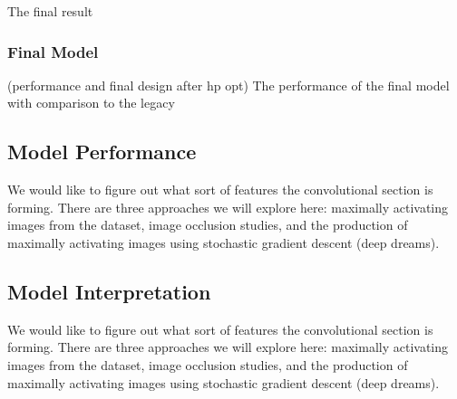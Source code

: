 The final result


\subsubsection{Final Model}
(performance and final design after hp opt)
The performance of the final model with comparison to the legacy

\subsection{Model Performance}
We would like to figure out what sort of features the convolutional section is forming. There are three approaches we will explore here: maximally activating images from the dataset, image occlusion studies, and the production of maximally activating images using stochastic gradient descent (deep dreams).  

\subsection{Model Interpretation}
We would like to figure out what sort of features the convolutional section is forming. There are three approaches we will explore here: maximally activating images from the dataset, image occlusion studies, and the production of maximally activating images using stochastic gradient descent (deep dreams).  

